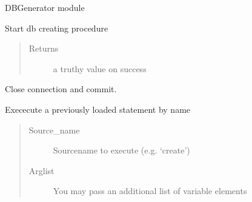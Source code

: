 \documentclass[letterpaper,10pt,english]{sphinxmanual}
\begin{document}
\begin{fulllineitems}
\label{dbgen:crawler.dbgen.DBGenerator}
DBGenerator module

\begin{fulllineitems}
\label{dbgen:crawler.dbgen.DBGenerator.batch}
Start db creating procedure
\begin{quote}\begin{description}
\item[{Returns}] \leavevmode
a truthy value on success

\end{description}\end{quote}

\end{fulllineitems}


\begin{fulllineitems}
\label{dbgen:crawler.dbgen.DBGenerator.close}
Close connection and commit.

\end{fulllineitems}


\begin{fulllineitems}
\label{dbgen:crawler.dbgen.DBGenerator.execute_statement}
Exececute a previously loaded statement by name
\begin{quote}\begin{description}
\item[{Source\_name }] \leavevmode
Sourcename to execute (e.g. `create')

\item[{Arglist }] \leavevmode
You may pass an additional list of variable elements

\end{description}\end{quote}

\end{fulllineitems}



\end{fulllineitems}
\end{document}
